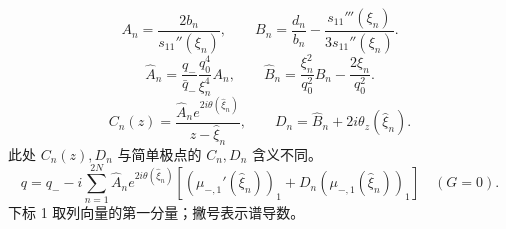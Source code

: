 \documentclass[lang=cn,scheme=chinese,mode=simple,device=normal,color=blue,
math=cm,thmcnt=section,12pt]{elegantbook}
\begin{document}
\[
    A_n=\dfrac{2b_n}{s_{11}''(\xi_n)},\qquad
    B_n=\dfrac{d_n}{b_n}-\dfrac{s_{11}'''(\xi_n)}{3s_{11}''(\xi_n)}.
\]
\[
    \widehat A_n=\dfrac{q_-}{\bar q_-}\dfrac{q_0^4}{\xi_n^4}A_n,\qquad
    \widehat B_n=\dfrac{\xi_n^2}{q_0^2}B_n-\dfrac{2\xi_n}{q_0^2}.
\]
\[
    C_n(z)=\dfrac{\widehat A_ne^{2i\theta(\widehat\xi_n)}}{z-\widehat\xi_n},\qquad D_n=\widehat B_n+2i\theta_z(\widehat\xi_n).
\]
此处 $C_n(z),D_n$ 与简单极点的 $C_n,D_n$ 含义不同。
\[
    q=q_--i\sum\limits_{n=1}^{2N}\widehat A_ne^{2i\theta(\widehat\xi_n)}
    \left[(\mu_{-,1}'(\widehat\xi_n))_1+D_n(\mu_{-,1}(\widehat\xi_n))_1\right]\quad(G=0).
\]
下标 1 取列向量的第一分量；撇号表示谱导数。
\end{document}
